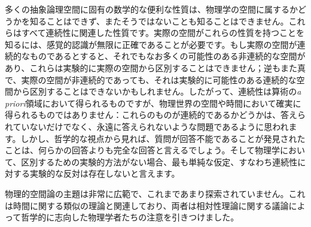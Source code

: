 \documentclass[a4paper,11pt,openany]{ltjsbook}
\begin{document}
多くの抽象論理空間に固有の数学的な便利な性質は、物理学の空間に属するかどうかを知ることはできず、またそうではないことも知ることはできません。これらはすべて連続性に関連した性質です。実際の空間がこれらの性質を持つことを知るには、感覚的認識が無限に正確であることが必要です。もし実際の空間が連続的なものであるとすると、それでもなお多くの可能性のある非連続的な空間があり、これらは実験的に実際の空間から区別することはできません；逆もまた真で、実際の空間が非連続的であっても、それは実験的に可能性のある連続的な空間から区別することはできないかもしれません。したがって、連続性は算術の\textit{a priori}領域において得られるものですが、物理世界の空間や時間において確実に得られるものではありません：これらのものが連続的であるかどうかは、答えられていないだけでなく、永遠に答えられないような問題であるように思われます。しかし、哲学的な視点から見れば、質問が回答不能であることが発見されたことは、何らかの回答よりも完全な回答と言えるでしょう。そして物理学において、区別するための実験的方法がない場合、最も単純な仮定、すなわち連続性に対する実験的な反対は存在しないと言えます。

物理的空間論の主題は非常に広範で、これまであまり探索されていません。これは時間に関する類似の理論と関連しており、両者は相対性理論に関する議論によって哲学的に志向した物理学者たちの注意を引きつけました。
\end{document}
